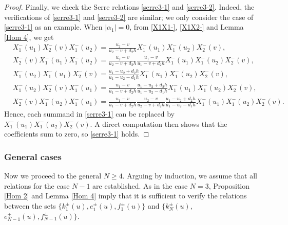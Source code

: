\documentclass[a4paper,12pt]{article}
\numberwithin{equation}{section}
\begin{document}
\begin{proof}
Finally, we check the Serre relations \eqref{serre3-1} and \eqref{serre3-2}. Indeed, the verifications of \eqref{serre3-1} and \eqref{serre3-2} are similar; we only consider the case of \eqref{serre3-1} as an example. When $|\alpha_{1}|=0$, from \eqref{X1X1-}, \eqref{X1X2-} and Lemma \ref{Hom 4}, we get
\begin{align*}
&X_{1}^{-}(u_{1})X_{2}^{-}(v)X_{1}^{-}(u_{2})=
\frac{u_{2}-v}{u_{2}-v+d_{2}h}X_{1}^{-}(u_{1})X_{1}^{-}(u_{2})X_{2}^{-}(v),\\
&X_{2}^{-}(v)X_{1}^{-}(u_{1})X_{1}^{-}(u_{2})=\frac{u_{2}-v}{u_{2}-v+d_{2}h}
\frac{u_{1}-v}{u_{1}-v+d_{2}h}X_{1}^{-}(u_{1})X_{1}^{-}(u_{2})X_{2}^{-}(v),\\
&X_{1}^{-}(u_{2})X_{1}^{-}(u_{1})X_{2}^{-}(v)=\frac{u_{1}-u_{2}+d_{2}h}
{u_{1}-u_{2}-d_{1}h}X_{1}^{-}(u_{1})X_{1}^{-}(u_{2})X_{2}^{-}(v),\\
&X_{1}^{-}(u_{2})X_{2}^{-}(v)X_{1}^{-}(u_{1})=\frac{u_{1}-v}{u_{1}-v+d_{2}h}\frac{u_{1}-u_{2}+d_{2}h}{u_{1}-u_{2}-d_{1}h}
X_{1}^{-}(u_{1})X_{1}^{-}(u_{2})X_{2}^{-}(v),\\
&X_{2}^{-}(v)X_{1}^{-}(u_{2})X_{1}^{-}(u_{1})=\frac{u_{1}-v}
{u_{1}-v+d_{2}h}\frac{u_{2}-v}{u_{2}-v+d_{2}h}\frac{u_{1}-u_{2}+d_{2}h}
{u_{1}-u_{2}-d_{1}h}X_{1}^{-}(u_{1})X_{1}^{-}(u_{2})X_{2}^{-}(v).
\end{align*}
Hence, each summand in \eqref{serre3-1} can be replaced by $X_{1}^{-}(u_{1})X_{1}^{-}(u_{2})X_{2}^{-}(v)$. A direct computation then shows that the coefficients sum to zero, so \eqref{serre3-1} holds.
\end{proof}


\subsubsection{General cases}

Now we proceed to the general $N\geqslant4$. Arguing by induction, we assume that all relations for the case $N-1$ are established. As in the case $N=3$, Proposition \ref{Hom 2} and Lemma \ref{Hom 4} imply that it is sufficient to verify the relations between the sets $\{k_1^{\pm}(u), e_1^{\pm}(u), f_1^{\pm}(u)\}$ and $\{k_N^{\pm}(u)$, $e_{N-1}^{\pm}(u), f_{N-1}^{\pm}(u)\}$. 
\end{document}
